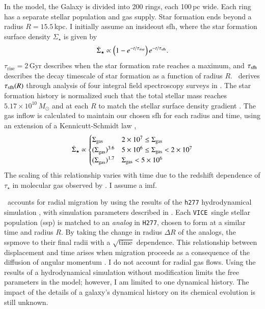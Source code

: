 \documentclass[12pt,oneside,letterpaper]{report}
\newcommand{\sfh}{\gls{sfh}}
\newcommand{\ssp}{\gls{ssp}}
\newcommand{\imf}{\gls{imf}}
\newcommand{\JJ}{\citetalias{james+21}}
\newcommand{\VICE}{\texttt{VICE}}
\begin{document}
In the model, the Galaxy is divided into 200 rings, each 100\,pc wide. Each ring has a separate stellar population and gas supply. Star formation ends beyond a radius $R=15.5\,$kpc. I initially assume an \gls{insideout} \sfh{}, where the star formation surface density $\Sigma_\star$ is given by 
\begin{equation}\label{eq:inside_out}
    \dot{\Sigma}_\star \propto \left(1-e^{-t/\tau_{\rm rise}}\right) e^{-t/\tau_{\rm sfh}}.
\end{equation}
$\tau_\text{rise}=2$\,Gyr describes when the star formation rate reaches a maximum, and $\tau_{\rm sfh}$ describes the decay timescale of star formation as a function of radius $R$. \JJ~derives $\tau_{\rm sfh}(R)$ through analysis of four integral field spectroscopy surveys in \cite{sanches20}. The star formation history is normalized such that the total stellar mass reaches $5.17\times10^{10}\,M_\odot$ \citep{LM15} and at each $R$ to match the stellar surface density gradient \citep{BHG16}.
The gas inflow is calculated to maintain our chosen \sfh{} for each radius and time, using an extension of a Kennicutt-Schmidt law \citep{kennicutt98},
\begin{equation}
\dot{\Sigma}_{\star} \propto 
\begin{cases}
    {\Sigma}_{\rm gas} & 2\times 10^7 \leq \Sigma_{\rm gas} \\ 
    {(\Sigma}_{\rm gas})^{3.6} & 5\times 10^6 \leq \Sigma_{\rm gas} < 2\times10^7 \\ 
    {(\Sigma}_{\rm gas})^{1.7} & \Sigma_{\rm gas} < 5\times10^6 \\ 
\end{cases}
\end{equation}
The scaling of this relationship varies with time due to the redshift dependence of $\tau_\star$ in molecular gas observed by \citet{tacconi18}. I assume a \citet{kroupa01} \imf.


\JJ\ accounts for radial migration by using the results of the \texttt{h277} hydrodynamical simulation \citep{christensen12, zolotov12, loebman12, BZ14}, with simulation parameters described in \citet{bird+21}. Each \VICE\ single stellar population (\ssp) is matched to an \textit{analog} in \texttt{H277}, chosen to form at a similar time and radius $R$. By taking the change in radius $\Delta R$ of the analogs, the \ssp move to their final radii with a $\sqrt{\text{time}}$ dependence.
This relationship between displacement and time arises when migration proceeds as a consequence of the diffusion of angular momentum \citep{frankel18, frankel20}.
I do not account for radial gas flows.
Using the results of a hydrodynamical simulation without modification limits the free parameters in the model; however, I am limited to one dynamical history. The impact of the details of a galaxy's dynamical history on its chemical evolution is still unknown.
\end{document}
